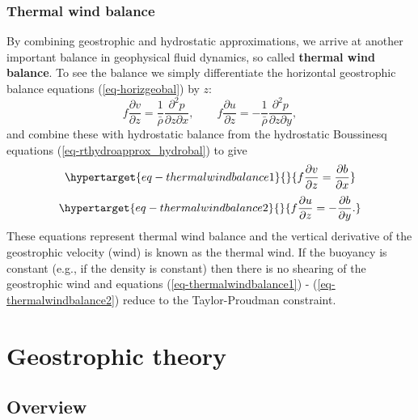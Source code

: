 \documentclass[
  letterpaper,
  twocolumn,
  landscape]{report}
\begin{document}
\hypertarget{sec-thermalwind}{%
\subsection{Thermal wind balance}\label{sec-thermalwind}}

By combining geostrophic and hydrostatic approximations, we arrive at
another important balance in geophysical fluid dynamics, so called
\textbf{thermal wind balance}. To see the balance we simply
differentiate the horizontal geostrophic balance equations
(\ref{eq-horizgeobal}) by \(z\): \[
f\frac{\partial v}{\partial z} = \frac{1}{\bar\rho}\frac{\partial^2 p}{\partial z \partial x}, \quad\quad f\frac{\partial u}{\partial z} = -\frac{1}{\bar\rho}\frac{\partial^2 p}{\partial z \partial y},
\] and combine these with hydrostatic balance from the hydrostatic
Boussinesq equations (\ref{eq-rthydroapprox_hydrobal}) to give
\begin{equation}\protect\hypertarget{eq-thermalwindbalance1}{}{ f\frac{\partial v}{\partial z} = \frac{\partial b}{\partial x} }\label{eq-thermalwindbalance1}\end{equation}
\begin{equation}\protect\hypertarget{eq-thermalwindbalance2}{}{ f\frac{\partial u}{\partial z} = -\frac{\partial b}{\partial y}. }\label{eq-thermalwindbalance2}\end{equation}
These equations represent thermal wind balance and the vertical
derivative of the geostrophic velocity (wind) is known as the thermal
wind. If the buoyancy is constant (e.g., if the density is constant)
then there is no shearing of the geostrophic wind and equations
(\ref{eq-thermalwindbalance1}) - (\ref{eq-thermalwindbalance2}) reduce
to the Taylor-Proudman constraint.

\hypertarget{sec-Geostrophic}{%
\chapter{Geostrophic theory}\label{sec-Geostrophic}}

\hypertarget{overview-2}{%
\section{Overview}\label{overview-2}}
\end{document}
